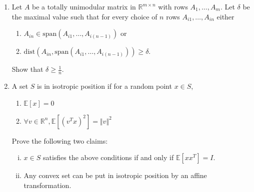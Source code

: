 \documentclass[11pt,a4paper]{article}
\renewcommand{\geq}{\geqslant}
\begin{document}
\begin{enumerate}
\item Let $A$ be a totally unimodular matrix in $\mathbb{R}^{m \times n}$ with rows $A_1, \hdots, A_m$. Let $\delta$ be the maximal value such that for every choice of $n$ rows $A_{i1}, \hdots, A_{in}$ either 
\begin{enumerate}
    \item $A_{in} \in \text{span}(A_{i1}, \hdots, A_{i(n-1)})$ or 
    \item $\text{dist}(A_{in}, \text{span}(A_{i1}, \hdots, A_{i(n-1)})) \geq \delta$. 
\end{enumerate}
Show that $\delta \geq \frac{1}{n}$. 

\item A set $S$ is in isotropic position if for a random point $x ∈ S$, \begin{enumerate}
    \item $\mathbb{E}[x] = 0 $
    \item $\forall v \in \mathbb{R}^n, \mathbb{E}[(v^Tx)^2] = \Vert v \Vert^2$
\end{enumerate}
Prove the following two claims:
\begin{enumerate}[(i)]
    \item $x \in S$ satisfies the above conditions if and only if $\mathbb{E}[xx^T ] = I$.
    \item Any convex set can be put in isotropic position by an affine transformation.
\end{enumerate}



\end{enumerate}


%
%


 
\end{document}
